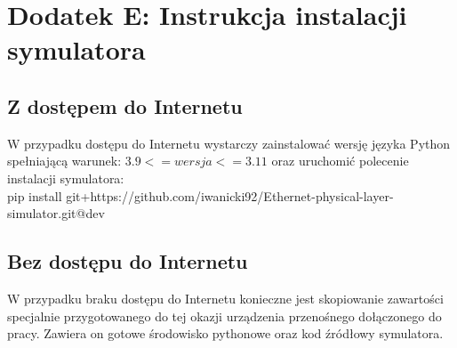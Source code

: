 \setcounter{secnumdepth}{0}
\section*{Dodatek E: Instrukcja instalacji symulatora}

\subsection{Z dostępem do Internetu}
W przypadku dostępu do Internetu wystarczy zainstalować wersję języka Python spełniającą warunek: $3.9 <= wersja <= 3.11$ oraz uruchomić polecenie instalacji symulatora: \\ pip install git+https://github.com/iwanicki92/Ethernet-physical-layer-simulator.git@dev

\subsection{Bez dostępu do Internetu}
W przypadku braku dostępu do Internetu konieczne jest skopiowanie zawartości specjalnie przygotowanego do tej okazji urządzenia przenośnego dołączonego do pracy. Zawiera on gotowe środowisko pythonowe oraz kod źródłowy symulatora.